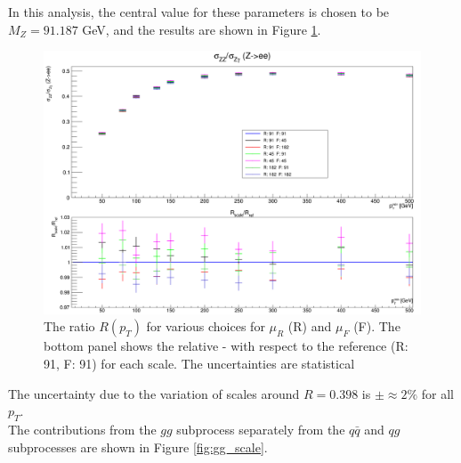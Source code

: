 \documentclass[11pt,a4paper,final]{report}
\begin{document}
In this analysis, the central value for these parameters is chosen to be $M_Z = 91.187$ GeV, and the results are shown in Figure \ref{fig:scalecompare}.
\begin{figure}[H]
\centering
\includegraphics[width=0.8\linewidth]{scale/nlo_scale_overlay.png}
\caption{The ratio $R(p_T)$ for various choices for $\mu_R$ (R) and $\mu_F$ (F). The bottom panel shows the relative - with respect to the reference (R: 91, F: 91) for each scale. The uncertainties are statistical}
\label{fig:scalecompare}
\end{figure}
The uncertainty due to the variation of scales around $R = 0.398$ is $\pm \approx 2\%$ for all $p_T$.\\
The contributions from the $gg$ subprocess separately from the $q\bar{q}$ and $qg$ subprocesses are shown in Figure \ref{fig:gg_scale}.
\end{document}
